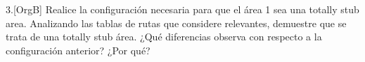 \begin{ejer}
3.[OrgB] Realice la configuración necesaria para que el área 1 sea una totally stub area. Analizando las tablas de rutas que considere relevantes, demuestre que se trata de una totally stub área. ¿Qué diferencias observa con respecto a la configuración anterior? ¿Por qué?
\end{ejer}